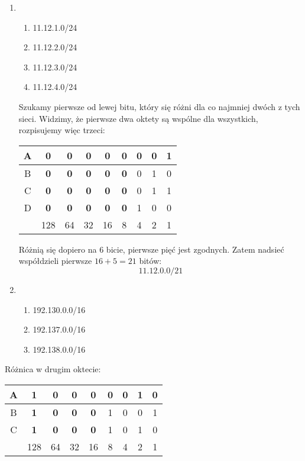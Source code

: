 \documentclass[main.tex]{subfiles}
\begin{document}
    \begin{enumerate}
        \item
        \begin{enumerate}[label=(\Alph*)]
            \item 11.12.1.0/24
            \item 11.12.2.0/24
            \item 11.12.3.0/24
            \item 11.12.4.0/24
        \end{enumerate}
        Szukamy pierwsze od lewej bitu, który się różni dla co najmniej dwóch z tych sieci. Widzimy, że pierwsze dwa
        oktety są wspólne dla wszystkich, rozpisujemy więc trzeci:
        \begin{center}
            \begin{tabular}{c || c c c c c | c c c}
                A & \textbf{0} & \textbf{0} & \textbf{0} & \textbf{0} & \textbf{0} & 0 & 0 & 1\\
                \hline
                B & \textbf{0} & \textbf{0} & \textbf{0} & \textbf{0} & \textbf{0} & 0 & 1 & 0\\
                \hline
                C & \textbf{0} & \textbf{0} & \textbf{0} & \textbf{0} & \textbf{0} & 0 & 1 & 1\\
                \hline
                D & \textbf{0} & \textbf{0} & \textbf{0} & \textbf{0} & \textbf{0} & 1 & 0 & 0\\
                \hline
                \hline
                & 128 & 64 & 32 & 16 & 8 & 4 & 2 & 1\\
            \end{tabular}
        \end{center}
        Różnią się dopiero na 6 bicie, pierwsze pięć jest zgodnych. Zatem nadsieć współdzieli pierwsze $16+5=21$ bitów:
        \[11.12.0.0/21\]

        \item
        \begin{enumerate}[label=(\Alph*)]
            \item 192.130.0.0/16
            \item 192.137.0.0/16
            \item 192.138.0.0/16
        \end{enumerate}
    \end{enumerate}
    Różnica w drugim oktecie:
    \begin{center}
        \begin{tabular}{c || c c c c | c c c c}
            A & \textbf{1} & \textbf{0} & \textbf{0} & \textbf{0} & 0 & 0 & 1 & 0\\
            \hline
            B & \textbf{1} & \textbf{0} & \textbf{0} & \textbf{0} & 1 & 0 & 0 & 1\\
            \hline
            C & \textbf{1} & \textbf{0} & \textbf{0} & \textbf{0} & 1 & 0 & 1 & 0\\
            \hline
            \hline
            & 128 & 64 & 32 & 16 & 8 & 4 & 2 & 1\\
        \end{tabular}
    \end{center}
\end{document}
